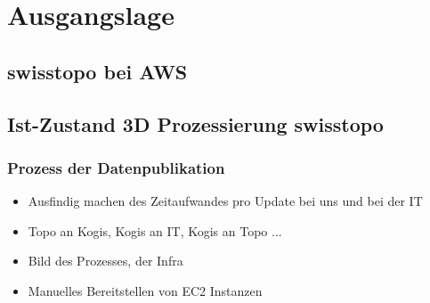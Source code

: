 \section{Ausgangslage}
\subsection{swisstopo bei AWS}
\subsection{Ist-Zustand 3D Prozessierung swisstopo}
\subsubsection{Prozess der Datenpublikation}
\begin{itemize}
\item Ausfindig machen des Zeitaufwandes pro Update bei uns und bei der IT
\item Topo an Kogis, Kogis an IT, Kogis an Topo ... 
\item Bild des Prozesses, der Infra
\item Manuelles Bereitstellen von EC2 Instanzen
\end{itemize}